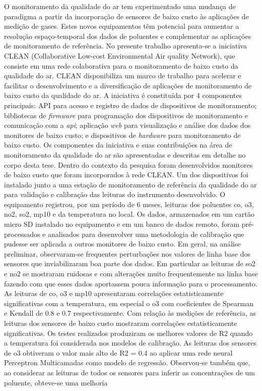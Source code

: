 \setlength{\absparsep}{18pt} %
\begin{resumo}
	\SingleSpacing
	O monitoramento da qualidade do ar tem experimentado uma mudança de paradigma a partir da incorporação de sensores de baixo custo às aplicações de medição de gases. Estes novos equipamentos têm potencial para aumentar a resolução espaço-temporal dos dados de poluentes e complementar as aplicações de monitoramento de referência. No presente trabalho apresenta-se a iniciativa CLEAN (Collaborative Low-cost Environmental Air quality Network), que consiste em uma rede colaborativa para o monitoramento de baixo custo da qualidade do ar. CLEAN disponibiliza um marco de trabalho para acelerar e facilitar o desenvolvimento e a diversificação de aplicações de monitoramento de baixo custo da qualidade do ar. A iniciativa é constituída por 4 componentes principais: API para acesso e registro de dados de dispositivos de monitoramento; bibliotecas de \textit{firmware} para programação dos dispositivos de monitoramento e comunicação com a \textit{api}; aplicação \textit{web} para visualização e análise dos dados dos monitores de baixo custo; e dispositivos de \textit{hardware} para monitoramento de baixo custo. Os componentes da iniciativa e suas contribuições na área de monitoramento da qualidade do ar são apresentadas e descritas em detalhe no corpo desta tese. Dentro do contexto da pesquisa foram desenvolvidos monitores de baixo custo que foram incorporados à rede CLEAN. Um dos dispositivos foi instalado junto a uma estação de monitoramento de referência da qualidade do ar para validação e calibração das leituras do instrumento desenvolvido. O equipamento registrou, por um período de 6 meses, leituras dos poluentes \acrshort{co}, \acrshort{o3}, \acrshort{no2}, \acrshort{so2}, \acrshort{mp10} e da temperatura no local. Os dados, armazenados em um cartão micro SD instalado no equipamento e em um banco de dados remoto, foram pré-processados e analisados para desenvolver uma metodologia de calibração que pudesse ser aplicada a outros monitores de baixo custo. Em geral, na análise preliminar, observaram-se frequentes perturbações nos valores de linha base dos sensores que inviabilizaram boa parte dos dados. Em particular as leituras de \acrshort{so2} e \acrshort{no2} se mostraram ruidosas e com alterações muito frequentemente na linha base fazendo com que esses dados aportassem pouca informação para o processamento. As leituras de \acrshort{co}, \acrshort{o3} e \acrshort{mp10} apresentaram correlações estatisticamente significativas com a temperatura, em especial o \acrshort{o3} com coeficientes de Spearman e Kendall de 0.8 e 0.7 respectivamente. Com relação às medições de referência, as leituras dos sensores de baixo custo mostraram correlações estatisticamente significativas. Os testes realizados produziram os melhores valores de R2 quando a temperatura foi considerada nos modelos de calibração. As leituras dos sensores de \acrshort{o3} obtiveram o valor mais alto de R2 = 0.4 ao aplicar uma rede neural Perceptron Multicamadas como modelo de regressão. Observou-se também que, ao considerar as leituras de todos os sensores para inferir as concentrações de um poluente, obteve-se uma melhoria 
\end{resumo}
